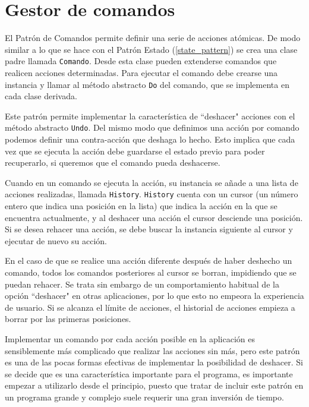 \section{Gestor de comandos}
\label{command_pattern}
El Patrón de Comandos permite definir una serie de acciones atómicas. De modo similar a lo que se hace con el Patrón Estado (\ref{state_pattern}) se crea una clase padre llamada \texttt{Comando}. Desde esta clase pueden extenderse comandos que realicen acciones determinadas. Para ejecutar el comando debe crearse una instancia y llamar al método abstracto \texttt{Do} del comando, que se implementa en cada clase derivada.

Este patrón permite implementar la característica de ``deshacer" acciones con el método abstracto \texttt{Undo}. Del mismo modo que definimos una acción por comando podemos definir una contra-acción que deshaga lo hecho. Esto implica que cada vez que se ejecuta la acción debe guardarse el estado previo para poder recuperarlo, si queremos que el comando pueda deshacerse.

Cuando en un comando se ejecuta la acción, su instancia se añade a una lista de acciones realizadas, llamada \texttt{History}. \texttt{History} cuenta con un cursor (un número entero que indica una posición en la lista) que indica la acción en la que se encuentra actualmente, y al deshacer una acción el cursor desciende una posición. Si se desea rehacer una acción, se debe buscar la instancia siguiente al cursor y ejecutar de nuevo su acción.

En el caso de que se realice una acción diferente después de haber deshecho un comando, todos los comandos posteriores al cursor se borran, impidiendo que se puedan rehacer. Se trata sin embargo de un comportamiento habitual de la opción ``deshacer" en otras aplicaciones, por lo que esto no empeora la experiencia de usuario. Si se alcanza el límite de acciones, el historial de acciones empieza a borrar por las primeras posiciones.

Implementar un comando por cada acción posible en la aplicación es sensiblemente más complicado que realizar las acciones sin más, pero este patrón es una de las pocas formas efectivas de implementar la posibilidad de deshacer. Si se decide que es una característica importante para el programa, es importante empezar a utilizarlo desde el principio, puesto que tratar de incluir este patrón en un programa grande y complejo suele requerir una gran inversión de tiempo.

